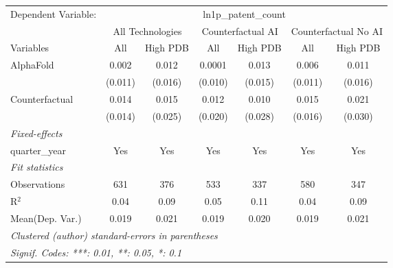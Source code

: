 \begingroup
\centering
\begin{tabular}{lcccccc}
   \tabularnewline \midrule \midrule
   Dependent Variable: & \multicolumn{6}{c}{ln1p\_patent\_count}\\
 & \multicolumn{2}{c}{All Technologies} & \multicolumn{2}{c}{Counterfactual AI} & \multicolumn{2}{c}{Counterfactual No AI} \\
\cmidrule(lr){1-1}\cmidrule(lr){2-3} \cmidrule(lr){4-5} \cmidrule(lr){6-7}
Variables & \multicolumn{1}{c}{All} & \multicolumn{1}{c}{High PDB} & \multicolumn{1}{c}{All} & \multicolumn{1}{c}{High PDB} & \multicolumn{1}{c}{All} & \multicolumn{1}{c}{High PDB} \\
\cmidrule(lr){1-1}\cmidrule(lr){2-2} \cmidrule(lr){3-3} \cmidrule(lr){4-4} \cmidrule(lr){5-5} \cmidrule(lr){6-6} \cmidrule(lr){7-7}
   AlphaFold      & 0.002   & 0.012   & 0.0001  & 0.013   & 0.006   & 0.011\\   
                  & (0.011) & (0.016) & (0.010) & (0.015) & (0.011) & (0.016)\\   
   Counterfactual & 0.014   & 0.015   & 0.012   & 0.010   & 0.015   & 0.021\\   
                  & (0.014) & (0.025) & (0.020) & (0.028) & (0.016) & (0.030)\\   
   \midrule
   \emph{Fixed-effects}\\
   quarter\_year  & Yes     & Yes     & Yes     & Yes     & Yes     & Yes\\  
   \midrule
   \emph{Fit statistics}\\
   Observations   & 631     & 376     & 533     & 337     & 580     & 347\\  
   R$^2$          & 0.04    & 0.09    & 0.05    & 0.11    & 0.04    & 0.09\\  
Mean(Dep. Var.) & 0.019 & 0.021 & 0.019 & 0.020 & 0.019 & 0.021 \\
   \midrule \midrule
   \multicolumn{7}{l}{\emph{Clustered (author) standard-errors in parentheses}}\\
   \multicolumn{7}{l}{\emph{Signif. Codes: ***: 0.01, **: 0.05, *: 0.1}}\\
\end{tabular}
\par\endgroup
